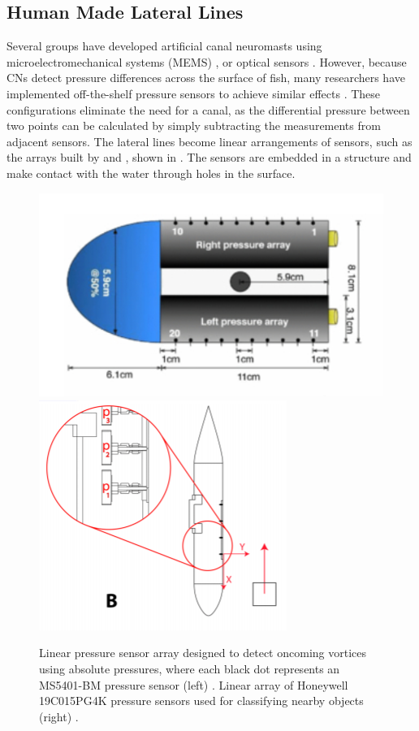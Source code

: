 
\subsection{Human Made Lateral Lines} \label{Human Made Lateral Lines}
 
    Several groups have developed artificial canal neuromasts using microelectromechanical systems (MEMS) \citep{Fan2002, Chen2007, Kottapalli2014} , or optical sensors \citep{Klein2011}. However, because CNs detect pressure differences across the surface of fish, many researchers have implemented off-the-shelf pressure sensors to achieve similar effects \citep{Venturelli2012} \citep{DeVries2015} \citep{Zhang2015}. These configurations eliminate the need for a canal, as the differential pressure between two points can be calculated by simply subtracting the measurements from adjacent sensors. The lateral lines become linear arrangements of sensors, such as the arrays built by \citep{Venturelli2012} and \citep{Fernandez2011}, shown in . The sensors are embedded in a structure and make contact with the water through holes in the surface.

\begin{figure}
\begin{center}
\includegraphics[width=0.60\columnwidth]{figures/Venturelli Setup.png}
\includegraphics[width=0.30\columnwidth]{figures/Fernandez Setup.png}
\end{center}
\caption{Linear pressure sensor array designed to detect oncoming vortices using absolute pressures, where each black dot represents an MS5401-BM pressure sensor (left) \citep{Venturelli2012}. Linear array of Honeywell 19C015PG4K pressure sensors used for classifying nearby objects (right) \citep{Fernandez2011}.}
\label{fig:PW:Human Lateral Lines}
\end{figure}

